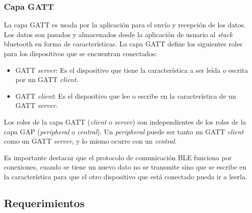 \subsubsection{Capa GATT}
La capa GATT es usada por la aplicación para el envío y recepción de los datos. Los datos son pasados y almacenados desde la aplicación de usuario al \textit{stack} bluetooth en forma de características. La capa GATT define los siguientes roles para los dispositivos que se encuentran conectados:
\begin{itemize}
\item GATT \textit{server}: Es el dispositivo que tiene la característica a ser leída o escrita por un GATT \textit{client}.
\item GATT \textit{client}: Es el dispositivo que lee o escribe en la característica de un GATT \textit{server}.
\end{itemize}

Los roles de la capa GATT (\textit{client} o \textit{server}) son independientes de los roles de la capa GAP (\textit{peripheral} o \textit{central}). Un \textit{peripheral} puede ser tanto un GATT \textit{client} como un GATT \textit{server}, y lo mismo ocurre con un \textit{central}.

Es importante destacar que el protocolo de comunicación BLE funciona por conexiones, cuando se tiene un nuevo dato no se transmite sino que se escribe en la característica para que el otro dispositivo que está conectado pueda ir a leerla. 

\subsection{Requerimientos}

